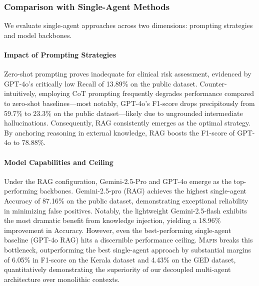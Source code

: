 \documentclass[a4paper,fleqn]{cas-dc}
\begin{document}
\subsubsection{Comparison with Single-Agent Methods}\label{vssingle}
We evaluate single-agent approaches across two dimensions: prompting strategies and model backbones. 

\paragraph{Impact of Prompting Strategies}
Zero-shot prompting proves inadequate for clinical risk assessment, evidenced by GPT-4o's critically low Recall of 13.89\% on the public dataset. Counter-intuitively, employing CoT prompting frequently degrades performance compared to zero-shot baselines—most notably, GPT-4o's F1-score drops precipitously from 59.7\% to 23.3\% on the public dataset—likely due to ungrounded intermediate hallucinations. Consequently, RAG consistently emerges as the optimal strategy. By anchoring reasoning in external knowledge, RAG boosts the F1-score of GPT-4o to 78.88\%.

\paragraph{Model Capabilities and Ceiling}
Under the RAG configuration, Gemini-2.5-Pro and GPT-4o emerge as the top-performing backbones. Gemini-2.5-pro (RAG) achieves the highest single-agent Accuracy of 87.16\% on the public dataset, demonstrating exceptional reliability in minimizing false positives. Notably, the lightweight Gemini-2.5-flash exhibits the most dramatic benefit from knowledge injection, yielding a 18.96\% improvement in Accuracy. However, even the best-performing single-agent baseline (GPT-4o RAG) hits a discernible performance ceiling. \textsc{Mapis} breaks this bottleneck, outperforming the best single-agent approach by substantial margins of 6.05\% in F1-score on the Kerala dataset and 4.43\% on the GED dataset, quantitatively demonstrating the superiority of our decoupled multi-agent architecture over monolithic contexts.
\end{document}
